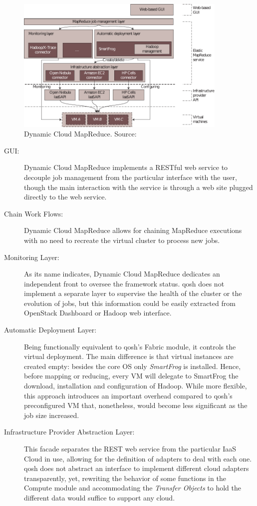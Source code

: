 \begin{figure}[tbp]
\begin{center}
\includegraphics[width=0.9\textwidth]{imagenes/037.pdf}
 \caption{Dynamic Cloud MapReduce. Source: \cite{dynamicmapreduce}}
\label{fig:arquitecturadynamicmapreduce}
\end{center}
\end{figure}

\begin{description}
    \item[GUI:] Dynamic Cloud MapReduce implements a RESTful web service to decouple job management from the particular interface with the user, though the main interaction with the service is through a web site plugged directly to the web service.
    \item[Chain Work Flows:] Dynamic Cloud MapReduce allows for chaining MapReduce executions with no need to recreate the virtual cluster to process new jobs.
    \item[Monitoring Layer:] As its name indicates, Dynamic Cloud MapReduce dedicates an independent front to oversee the framework status. qosh does not implement a separate layer to supervise the health of the cluster or the evolution of jobs, but this information could be easily extracted from OpenStack Dashboard or Hadoop web interface.
    \item[Automatic Deployment Layer:] Being functionally equivalent to qosh's Fabric module, it controls the virtual deployment. The main difference is that virtual instances are created empty: besides the core OS only \emph{SmartFrog} is installed. Hence, before mapping or reducing, every VM will delegate to SmartFrog the download, installation and configuration of Hadoop.
    While more flexible, this approach introduces an important overhead compared to qosh's preconfigured VM that, nonetheless, would become less significant as the job size increased.
    \item[Infrastructure Provider Abstraction Layer:] This facade separates the REST web service from the particular IaaS Cloud in use, allowing for the definition of adapters to deal with each one. qosh does not abstract an interface to implement different cloud adapters transparently, yet, rewriting the behavior of some functions in the Compute module and accommodating the \emph{Transfer Objects} to hold the different data would suffice to support any cloud.
\end{description}

